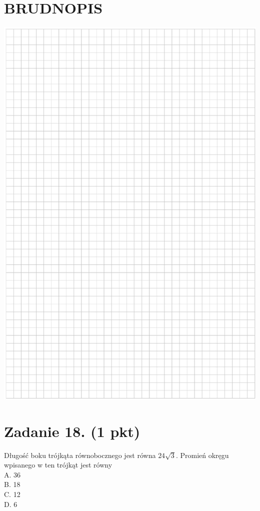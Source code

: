 \documentclass[10pt]{article}
\begin{document}
\section*{BRUDNOPIS}
\begin{center}
\includegraphics[max width=\textwidth]{2024_11_21_6a8be49478f78d0689cfg-07}
\end{center}

\section*{Zadanie 18. (1 pkt)}
Długość boku trójkąta równobocznego jest równa \(24 \sqrt{3}\). Promień okręgu wpisanego w ten trójkąt jest równy\\
A. 36\\
B. 18\\
C. 12\\
D. 6
\end{document}
